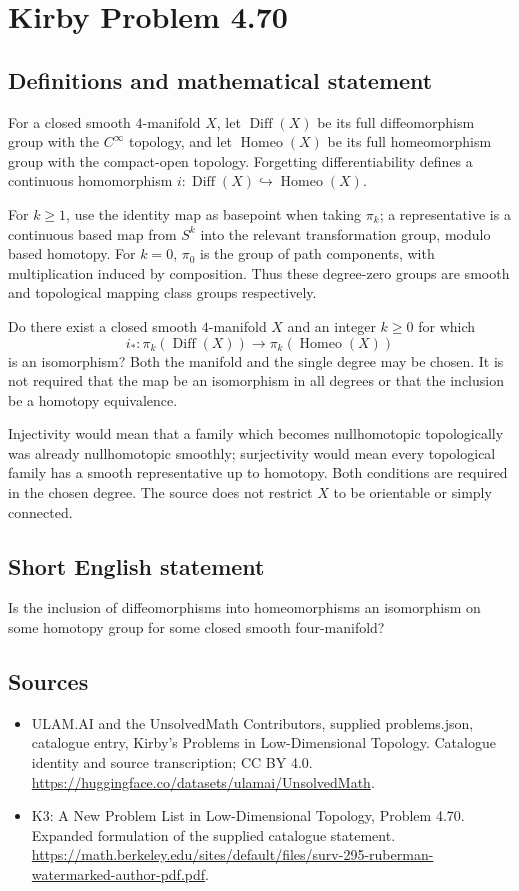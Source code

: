\documentclass[11pt,a4paper]{article}
\begin{document}
\section*{Kirby Problem 4.70}\label{statement}

\subsection{Definitions and mathematical statement}
For a closed smooth $4$-manifold $X$, let $\operatorname{Diff}(X)$
be its full diffeomorphism group with the $C^\infty$ topology, and
let $\operatorname{Homeo}(X)$ be its full homeomorphism group with
the compact-open topology. Forgetting differentiability defines a
continuous homomorphism $i:\operatorname{Diff}(X)\hookrightarrow
\operatorname{Homeo}(X)$.

For $k\ge1$, use the identity map as basepoint when taking
$\pi_k$; a representative is a continuous based map from $S^k$
into the relevant transformation group, modulo based homotopy.
For $k=0$, $\pi_0$ is the group of path components, with
multiplication induced by composition. Thus these degree-zero groups
are smooth and topological mapping class groups respectively.

Do there exist a closed smooth $4$-manifold $X$ and an integer
$k\ge0$ for which
\[
 i_*:\pi_k(\operatorname{Diff}(X))
      \longrightarrow\pi_k(\operatorname{Homeo}(X))
\]
is an isomorphism?
Both the manifold and the single degree may be chosen. It is not
required that the map be an isomorphism in all degrees or that the
inclusion be a homotopy equivalence.

Injectivity would mean that a family which becomes nullhomotopic
topologically was already nullhomotopic smoothly; surjectivity would
mean every topological family has a smooth representative up to
homotopy. Both conditions are required in the chosen degree. The
source does not restrict $X$ to be orientable or simply connected.
\subsection{Short English statement}
Is the inclusion of diffeomorphisms into homeomorphisms an isomorphism on some homotopy group for some closed smooth four-manifold?
\subsection{Sources}
\begin{itemize}
\item[S1] ULAM.AI and the UnsolvedMath Contributors, supplied problems.json, catalogue entry, Kirby's Problems in Low-Dimensional Topology. Catalogue identity and source transcription; CC BY 4.0.
\url{https://huggingface.co/datasets/ulamai/UnsolvedMath}.
\item[S2] K3: A New Problem List in Low-Dimensional Topology, Problem 4.70. Expanded formulation of the supplied catalogue statement.
\url{https://math.berkeley.edu/sites/default/files/surv-295-ruberman-watermarked-author-pdf.pdf}.
\end{itemize}
\end{document}
